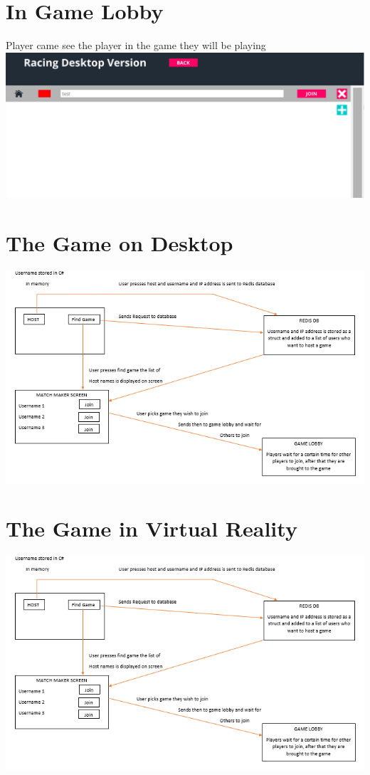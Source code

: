 \section{In Game Lobby}
Player came see the player in the game they will be playing
\newline
\includegraphics[width=1\columnwidth]{img/LobbyActual.PNG}

\section{The Game on Desktop}

\includegraphics[width=1\columnwidth]{img/redisMatch.PNG}

\section{The Game in Virtual Reality}

\includegraphics[width=1\columnwidth]{img/redisMatch.PNG}

